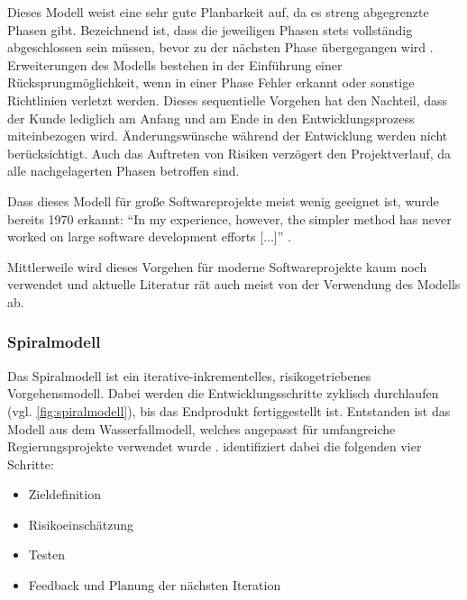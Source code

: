 Dieses Modell weist eine sehr gute Planbarkeit auf, da es streng abgegrenzte Phasen gibt. 
Bezeichnend ist, dass die jeweiligen Phasen stets vollständig abgeschlossen sein müssen, bevor zu der nächsten Phase übergegangen wird \parencite[Vgl.][S. 48]{Schatten:2010aa}.
Erweiterungen des Modells bestehen in der Einführung einer Rücksprungmöglichkeit, wenn in einer Phase Fehler erkannt oder sonstige Richtlinien verletzt werden.
Dieses sequentielle Vorgehen hat den Nachteil, dass der Kunde lediglich am Anfang und am Ende in den Entwicklungsprozess miteinbezogen wird.
Änderungswünsche während der Entwicklung werden nicht berücksichtigt.
Auch das Auftreten von Risiken verzögert den Projektverlauf, da alle nachgelagerten Phasen betroffen sind.

Dass dieses Modell für große Softwareprojekte meist wenig geeignet ist, wurde bereits 1970 erkannt: \enquote{In my experience, however, the simpler method has never worked on large software development efforts [...]} \parencite[][]{Royce:1970aa}.

Mittlerweile wird dieses Vorgehen für moderne Softwareprojekte kaum noch verwendet und aktuelle Literatur rät auch meist von der Verwendung des Modells ab.
\parencite[Vgl.][S. 49]{Schatten:2010aa}

\subsubsection{Spiralmodell}

Das Spiralmodell ist ein iterative-inkrementelles, risikogetriebenes Vorgehensmodell.
Dabei werden die Entwicklungsschritte zyklisch durchlaufen (vgl. \autoref{fig:spiralmodell}), bis das Endprodukt fertiggestellt ist.
Entstanden ist das Modell aus dem Wasserfallmodell, welches angepasst für umfangreiche Regierungsprojekte verwendet wurde \parencite[][]{Boehm:1988aa}.
\parencite[][S. 57]{Schatten:2010aa} identifiziert dabei die folgenden vier Schritte:

\begin{itemize}
\item Zieldefinition
\item Risikoeinschätzung
\item Testen
\item Feedback und Planung der nächsten Iteration
\end{itemize}

